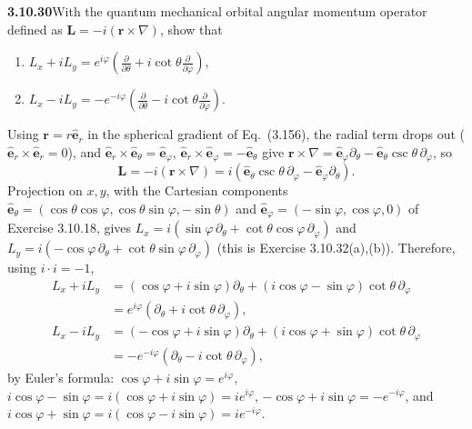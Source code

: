 \par\bigskip
\noindent\textbf{3.10.30}\quad With the quantum mechanical orbital angular
momentum operator defined as $\mathbf{L}=-i(\mathbf{r}\times\nabla)$, show
that
\begin{enumerate}
\item[(a)] $\displaystyle L_{x}+iL_{y}=e^{i\varphi}\left(\frac{\partial}
  {\partial\theta}+i\cot\theta\frac{\partial}{\partial\varphi}\right)$,
\item[(b)] $\displaystyle L_{x}-iL_{y}=-e^{-i\varphi}\left(\frac{\partial}
  {\partial\theta}-i\cot\theta\frac{\partial}{\partial\varphi}\right)$.
\end{enumerate}
\solution
Using $\mathbf r=r\hat{\mathbf e}_r$ in the spherical gradient of
Eq.~(3.156), the radial term drops out
($\hat{\mathbf e}_r\times\hat{\mathbf e}_r=0$), and
$\hat{\mathbf e}_r\times\hat{\mathbf e}_\theta=\hat{\mathbf e}_\varphi$,
$\hat{\mathbf e}_r\times\hat{\mathbf e}_\varphi=-\hat{\mathbf e}_\theta$
give
$\mathbf r\times\nabla=\hat{\mathbf e}_\varphi\partial_\theta
-\hat{\mathbf e}_\theta\csc\theta\,\partial_\varphi$, so
\[
\mathbf L=-i(\mathbf r\times\nabla)
=i\left(\hat{\mathbf e}_\theta\csc\theta\,\partial_\varphi
-\hat{\mathbf e}_\varphi\partial_\theta\right).
\]
Projection on $x,y$, with the Cartesian components
$\hat{\mathbf e}_\theta=(\cos\theta\cos\varphi,\cos\theta\sin\varphi,-\sin\theta)$
and $\hat{\mathbf e}_\varphi=(-\sin\varphi,\cos\varphi,0)$ of
Exercise 3.10.18, gives
$L_x=i(\sin\varphi\,\partial_\theta+\cot\theta\cos\varphi\,\partial_\varphi)$
and
$L_y=i(-\cos\varphi\,\partial_\theta+\cot\theta\sin\varphi\,\partial_\varphi)$
(this is Exercise 3.10.32(a),(b)).
Therefore, using $i\cdot i=-1$,
\[
\begin{aligned}
L_x+iL_y
&=(\cos\varphi+i\sin\varphi)\partial_\theta
+(i\cos\varphi-\sin\varphi)\cot\theta\,\partial_\varphi\\
&=\boxed{e^{i\varphi}(\partial_\theta+i\cot\theta\,\partial_\varphi)},\\
L_x-iL_y
&=(-\cos\varphi+i\sin\varphi)\partial_\theta
+(i\cos\varphi+\sin\varphi)\cot\theta\,\partial_\varphi\\
&=\boxed{-e^{-i\varphi}(\partial_\theta-i\cot\theta\,\partial_\varphi)},
\end{aligned}
\]
by Euler's formula: $\cos\varphi+i\sin\varphi=e^{i\varphi}$,
$i\cos\varphi-\sin\varphi=i(\cos\varphi+i\sin\varphi)=ie^{i\varphi}$,
$-\cos\varphi+i\sin\varphi=-e^{-i\varphi}$, and
$i\cos\varphi+\sin\varphi=i(\cos\varphi-i\sin\varphi)=ie^{-i\varphi}$.

